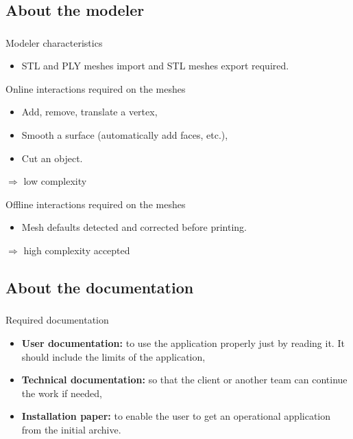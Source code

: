 \documentclass{beamer}
\begin{document}
\subsection{About the modeler}
\begin{frame}
	\frametitle{}
	 \begin{block}{Modeler characteristics}
		\begin{itemize}
			\item STL and PLY meshes import and STL meshes export required.
		\end{itemize}
    \end{block}
    
    \begin{block}{Online interactions required on the meshes}
		\begin{itemize}
			\item Add, remove, translate a vertex,
			\item Smooth a surface (automatically add faces, etc.),
			\item Cut an object.
		\end{itemize}
			$\Longrightarrow$ low complexity
    \end{block}
    
    \begin{block}{Offline interactions required on the meshes}
		\begin{itemize}
			\item Mesh defaults detected and corrected before printing.
		\end{itemize}
			$\Longrightarrow$ high complexity accepted
    \end{block}

\end{frame}

\subsection{About the documentation}
\begin{frame}
	\frametitle{}
	 \begin{block}{Required documentation}
		\begin{itemize}
			\item \textbf{User documentation:} to use the application properly just by reading it. It should include the limits of the application,
			\item \textbf{Technical documentation:} so that the client or another team can continue the work if needed,
			\item \textbf{Installation paper:} to enable the user to get an operational application from the initial archive.
		\end{itemize}
    \end{block}    

\end{frame}
\end{document}
